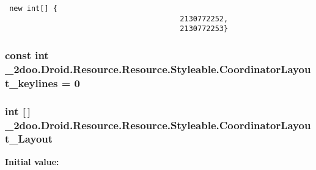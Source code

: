 \begin{Code}\begin{verbatim} new int[] {
                                        2130772252,
                                        2130772253}
\end{verbatim}
\end{Code}
\hypertarget{class__2doo_1_1_droid_1_1_resource_1_1_styleable_8dee656d6d34a5ad7687d54d196e309e}{
\subsubsection[{CoordinatorLayout\_\-keylines}]{\setlength{\rightskip}{0pt plus 5cm}const int \_\-2doo.Droid.Resource.Resource.Styleable.CoordinatorLayout\_\-keylines = 0}}
\label{class__2doo_1_1_droid_1_1_resource_1_1_styleable_8dee656d6d34a5ad7687d54d196e309e}


\hypertarget{class__2doo_1_1_droid_1_1_resource_1_1_styleable_10e12b29dd07eaa51c47d24e41aac3e9}{
\subsubsection[{CoordinatorLayout\_\-Layout}]{\setlength{\rightskip}{0pt plus 5cm}int \mbox{[}$\,$\mbox{]} \_\-2doo.Droid.Resource.Resource.Styleable.CoordinatorLayout\_\-Layout}}
\label{class__2doo_1_1_droid_1_1_resource_1_1_styleable_10e12b29dd07eaa51c47d24e41aac3e9}


\textbf{Initial value:}

